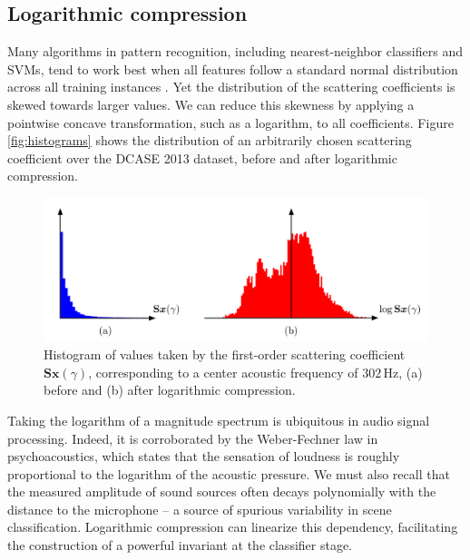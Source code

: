 \documentclass[journal]{IEEEtran}
\begin{document}
\subsection{Logarithmic compression}
\label{sec:logcomp}

Many algorithms in pattern recognition, including nearest-neighbor classifiers and SVMs, tend to work best when all features follow a standard normal distribution across all training instances \cite{Hsu2003}.
Yet the distribution of the scattering coefficients is skewed towards larger values. We can reduce this skewness by applying a pointwise concave transformation, such as a logarithm, to all coefficients.
Figure \ref{fig:histograms} shows the distribution of an arbitrarily chosen scattering coefficient over the DCASE 2013 dataset, before and after logarithmic compression.

\begin{figure}
\begin{center}
\includegraphics[width=\columnwidth]{compression}
\caption{
\label{fig:histograms}
Histogram of values taken by the first-order scattering coefficient $\mathbf{S}\boldsymbol{x}(\gamma)$, corresponding to a center acoustic frequency of $302\,\mathrm{Hz}$,
(a) before and (b) after logarithmic compression.}
\label{fig:compression}
\end{center}
\end{figure}


Taking the logarithm of a magnitude spectrum is ubiquitous in audio signal processing.
Indeed, it is corroborated by the Weber-Fechner law in psychoacoustics, which states that the sensation of loudness is roughly proportional to the logarithm of the acoustic pressure. 
We must also recall that the measured amplitude of sound sources often decays polynomially with the distance to the microphone -- a source of spurious variability in scene classification.
Logarithmic compression can linearize this dependency, facilitating the construction of a powerful invariant at the classifier stage.
\end{document}
